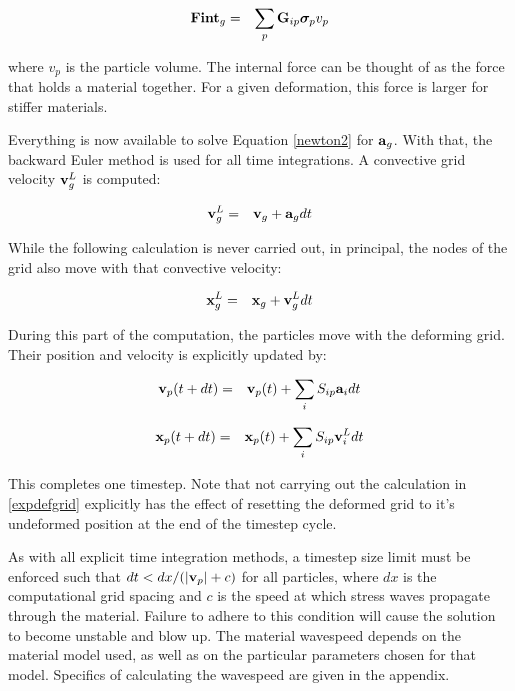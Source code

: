 \documentclass[10pt]{article}
\newcommand{\tn}[1]{\mbox{\bf{#1}}}
\newcommand{\sig}{\mbox{\boldmath $\sigma \!\!$ \unboldmath}}
\begin{document}
\begin{eqnarray}
	\tn{Fint}_g &=& \sum_{p} \tn{G}_{ip} \sig_p v_p
\end{eqnarray}

\noindent
where $v_p$ is the particle volume.  The internal force can be 
thought of as the force that holds a material together.  For a 
given deformation, this force is larger for stiffer materials.

Everything is now available to solve Equation \ref{newton2} for 
$\tn{a}_g$.
With that, the backward Euler method is used for all time 
integrations.
A convective grid velocity $\tn{v}^L_g$ is computed:

\begin{eqnarray}
	\tn{v}^L_g &=& \tn{v}_g  + \tn{a}_g dt
\end{eqnarray}

While the following calculation is never carried out, in 
principal, the
nodes of the grid also move with that convective velocity:

\begin{eqnarray}
	\tn{x}^L_g &=& \tn{x}_g  + \tn{v}^L_g dt     
\label{expdefgrid}
\end{eqnarray}

During this part of the computation, the particles move with the 
deforming
grid.  Their position and velocity is explicitly updated by:

\begin{eqnarray}
	\tn{v}_p (t + dt)  &=& \tn{v}_p (t)  + \sum_{i} S_{ip} 
\tn{a}_i  dt
\end{eqnarray}

\begin{eqnarray}
	\tn{x}_p (t + dt)  &=& \tn{x}_p (t)  + \sum_{i} S_{ip} 
\tn{v}^L_i  dt
\end{eqnarray}

This completes one timestep.  Note that not carrying out the 
calculation
in \ref{expdefgrid} explicitly has the effect of resetting the 
deformed
grid to it's undeformed position at the end of the timestep 
cycle.

As with all explicit time integration methods, a timestep size 
limit must
be enforced such that $dt < dx/(|\tn{v}_p| + c)$ for all 
particles, where $dx$ is the computational grid spacing and $c$ 
is the speed at which stress waves propagate through the 
material.
Failure to adhere to this condition will cause the solution to 
become
unstable and blow up.  The material wavespeed depends on the 
material model used, as well as on the particular parameters
chosen for that model.  Specifics of calculating the wavespeed
are given in the appendix.
\end{document}
